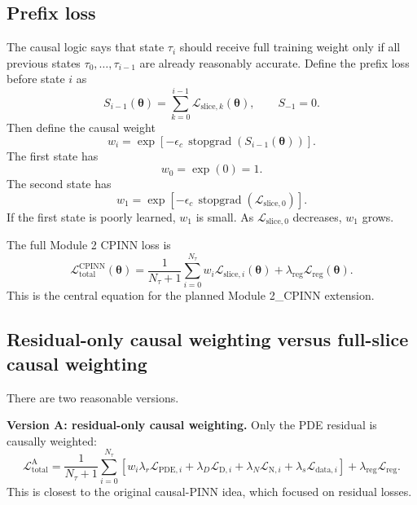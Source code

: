 \documentclass[11pt]{article}
\newcommand{\thetav}{\bm{\theta}}
\newcommand{\Lreg}{\mathcal{L}_{\mathrm{reg}}}
\newcommand{\Ltot}{\mathcal{L}_{\mathrm{total}}}
\newcommand{\taud}{\tau}
\newcommand{\stgrad}{\operatorname{stopgrad}}
\begin{document}
\subsection{Prefix loss}

The causal logic says that state $\taud_i$ should receive full training weight only if all previous states $\taud_0,\ldots,\taud_{i-1}$ are already reasonably accurate. Define the prefix loss before state $i$ as
\begin{equation}
S_{i-1}(\thetav)=\sum_{k=0}^{i-1}\mathcal{L}_{\mathrm{slice},k}(\thetav),
\qquad S_{-1}=0.
\label{eq:prefix_loss}
\end{equation}
Then define the causal weight
\begin{equation}
w_i=\exp\left[-\epsilon_c\,\stgrad\left(S_{i-1}(\thetav)\right)\right].
\label{eq:module2_causal_weight}
\end{equation}
The first state has
\begin{equation}
w_0=\exp(0)=1.
\end{equation}
The second state has
\begin{equation}
w_1=\exp\left[-\epsilon_c\,\stgrad(\mathcal{L}_{\mathrm{slice},0})\right].
\end{equation}
If the first state is poorly learned, $w_1$ is small. As $\mathcal{L}_{\mathrm{slice},0}$ decreases, $w_1$ grows.

The full Module 2 CPINN loss is
\begin{equation}
\Ltot^{\mathrm{CPINN}}(\thetav)=
\frac{1}{N_\taud+1}\sum_{i=0}^{N_\taud}w_i\mathcal{L}_{\mathrm{slice},i}(\thetav)
+\lambda_{\mathrm{reg}}\Lreg(\thetav).
\label{eq:module2_cpinn_loss}
\end{equation}
This is the central equation for the planned Module 2\_CPINN extension.

\subsection{Residual-only causal weighting versus full-slice causal weighting}

There are two reasonable versions.

\textbf{Version A: residual-only causal weighting.} Only the PDE residual is causally weighted:
\begin{equation}
\Ltot^{\mathrm{A}}=
\frac{1}{N_\taud+1}\sum_{i=0}^{N_\taud}
\left[w_i\lambda_r\mathcal{L}_{\mathrm{PDE},i}+\lambda_D\mathcal{L}_{\mathrm{D},i}+\lambda_N\mathcal{L}_{\mathrm{N},i}+\lambda_s\mathcal{L}_{\mathrm{data},i}\right]
+\lambda_{\mathrm{reg}}\Lreg.
\label{eq:residual_only_weighting}
\end{equation}
This is closest to the original causal-PINN idea, which focused on residual losses.
\end{document}
